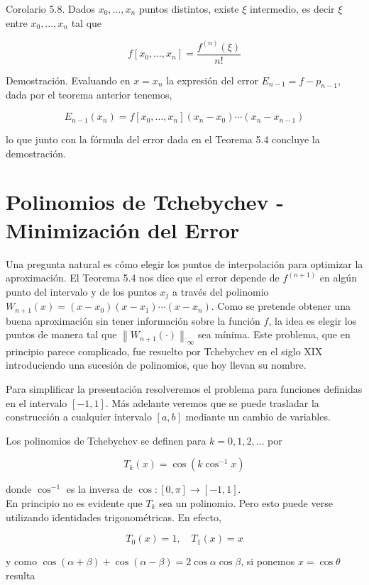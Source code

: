 \documentclass[10pt]{book}
\begin{document}
Corolario 5.8. Dados $x_{0}, \ldots, x_{n}$ puntos distintos, existe $\xi$ intermedio, es decir $\xi$ entre $x_{0}, \ldots, x_{n}$ tal que

$$
f\left[x_{0}, \ldots, x_{n}\right]=\frac{f^{(n)}(\xi)}{n!}
$$

Demostración. Evaluando en $x=x_{n}$ la expresión del error $E_{n-1}=f-p_{n-1}$, dada por el teorema anterior tenemos,

$$
E_{n-1}\left(x_{n}\right)=f\left[x_{0}, \ldots, x_{n}\right]\left(x_{n}-x_{0}\right) \cdots\left(x_{n}-x_{n-1}\right)
$$

lo que junto con la fórmula del error dada en el Teorema 5.4 concluye la demostración.

\section{Polinomios de Tchebychev - Minimización del Error}
Una pregunta natural es cómo elegir los puntos de interpolación para optimizar la aproximación. El Teorema 5.4 nos dice que el error depende de $f^{(n+1)}$ en algún punto del intervalo y de los puntos $x_{j}$ a través del polinomio $W_{n+1}(x)=\left(x-x_{0}\right)\left(x-x_{1}\right) \cdots\left(x-x_{n}\right)$. Como se pretende obtener una buena aproximación sin tener información sobre la función $f$, la idea es elegir los puntos de manera tal que $\left\|W_{n+1}(\cdot)\right\|_{\infty}$ sea mínima. Este problema, que en principio parece complicado, fue resuelto por Tchebychev en el siglo XIX introduciendo una sucesión de polinomios, que hoy llevan su nombre.

Para simplificar la presentación resolveremos el problema para funciones definidas en el intervalo $[-1,1]$. Más adelante veremos que se puede trasladar la construcción a cualquier intervalo $[a, b]$ mediante un cambio de variables.

Los polinomios de Tchebychev se definen para $k=0,1,2, \ldots$ por

$$
T_{k}(x)=\cos \left(k \cos ^{-1} x\right)
$$

donde $\cos ^{-1}$ es la inversa de $\cos :[0, \pi] \rightarrow[-1,1]$.\\
En principio no es evidente que $T_{k}$ sea un polinomio. Pero esto puede verse utilizando identidades trigonométricas. En efecto,

$$
T_{0}(x)=1, \quad T_{1}(x)=x
$$

y como $\cos (\alpha+\beta)+\cos (\alpha-\beta)=2 \cos \alpha \cos \beta$, si ponemos $x=\cos \theta$ resulta
\end{document}
